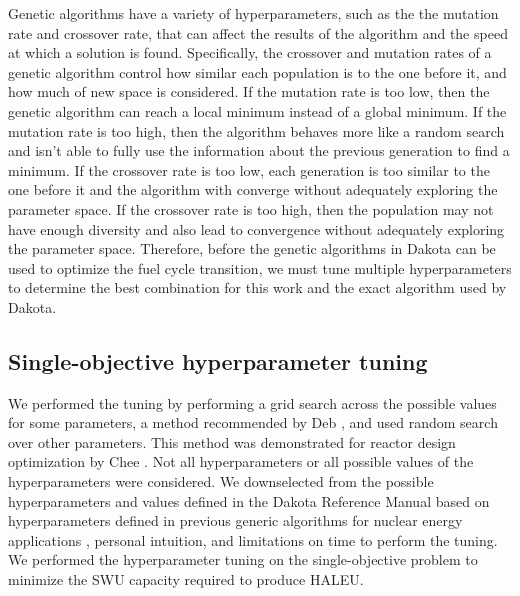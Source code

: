 Genetic algorithms have a variety of hyperparameters, such as the the 
mutation rate and crossover rate, that can affect 
the results of the algorithm and the speed at which a solution is found. 
Specifically, the crossover and mutation rates of a genetic algorithm 
control how similar each population is to the one before it, and how much 
of new space is considered. If the mutation rate is too low, then the 
genetic algorithm can reach a local minimum instead of a global 
minimum. If the mutation rate is too high, then the algorithm behaves more 
like a random search and isn't able to fully use the information about the 
previous generation to find a minimum. If the crossover rate is too low, 
each generation is too similar to the one before it and the algorithm 
with converge without adequately exploring the parameter space. If the 
crossover rate is too high, then the population may not have enough 
diversity and also lead to convergence without adequately exploring the 
parameter space. 
Therefore, before the genetic algorithms in Dakota can be used to 
optimize the fuel cycle transition, we must tune multiple hyperparameters
to determine the best combination for this work and the exact algorithm 
used by Dakota.

\subsection{Single-objective hyperparameter tuning}
We performed the tuning by performing a grid search across 
the possible values for some parameters, a method recommended 
by Deb \cite{deb_multi-objective_2001}, and used random 
search over other parameters. This method was demonstrated for reactor 
design optimization by Chee \cite{chee_fluoride-salt-cooled_2022}. 
Not all hyperparameters or all possible values of the hyperparameters 
were considered. We downselected from 
the possible hyperparameters and values defined in the Dakota Reference 
Manual based on hyperparameters defined in previous generic algorithms 
for nuclear energy applications
\cite{passerini_systematic_2014,chee_fluoride-salt-cooled_2022},
personal intuition, and limitations on time to perform 
the tuning. We performed the hyperparameter tuning on the single-objective 
problem to minimize the \gls{SWU} capacity required to produce 
\gls{HALEU}. 

